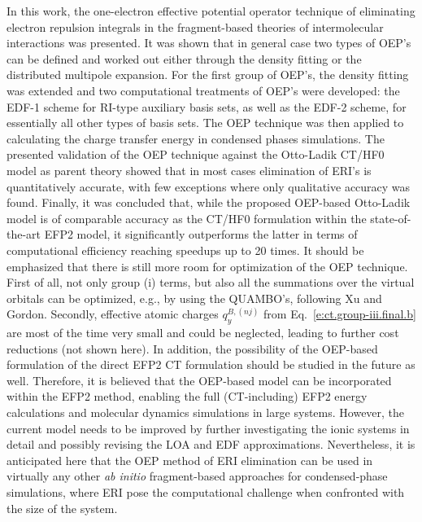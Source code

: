 \documentclass[aip,jcp,amsmath,amssymb,reprint,floatfix]{revtex4-1}
\begin{document}
In this work, the one\hyp{}electron effective potential operator technique
of eliminating electron repulsion integrals in the fragment\hyp{}based
theories of intermolecular interactions
was presented.
It was shown that in general case two types of OEP's
can be defined and worked out either through the density fitting or the distributed
multipole expansion. For the first group of OEP's, the density fitting was extended
and two computational treatments of OEP's were developed: the EDF-1 scheme
for RI\hyp{}type auxiliary basis sets, as well as the EDF-2 scheme, for
essentially all other types of basis sets. 
The OEP technique was then applied to calculating the charge transfer energy
in condensed phases simulations. 
The presented validation of the OEP technique
against the Otto\hyp{}Ladik CT/HF0 model as parent theory showed that in most cases
elimination of ERI's is quantitatively accurate, with few exceptions
where only qualitative accuracy was found. 
Finally, it was concluded that, while the proposed OEP\hyp{}based Otto\hyp{}Ladik
model is of comparable accuracy as the CT/HF0 formulation within the
state\hyp{}of\hyp{}the\hyp{}art EFP2 model, it significantly outperforms the latter
in terms of computational efficiency reaching speedups up to 20 times.
It should be emphasized that there is still more room for optimization of the
OEP technique. First of all, not only group (i) terms, but also
all the summations over the virtual orbitals can be optimized,
e.g., by using the QUAMBO's, following Xu and Gordon.\cite{Xu.Gordon.JCP.2013}
Secondly, effective atomic charges $q_y^{B,(nj)}$ from Eq.~\eqref{e:ct.group-iii.final.b}
are most of the time very small
and could be neglected, leading to further cost reductions (not shown here).
In addition, the possibility of the OEP\hyp{}based formulation of the direct EFP2 CT formulation
should be studied in the future as well.
Therefore, it is believed that the OEP\hyp{}based
model can be incorporated within the EFP2 method, enabling
the full (CT\hyp{}including) EFP2 energy calculations and 
molecular dynamics simulations in large systems. However, the current model
needs to be improved by further investigating the ionic
systems in detail and possibly revising the LOA and EDF approximations.
Nevertheless,
it is anticipated here that the OEP method of ERI elimination can be used in 
virtually any other 
\emph{ab initio} fragment\hyp{}based
approaches for condensed\hyp{}phase simulations, where ERI pose the
computational challenge when confronted with the size of the system.
\end{document}
